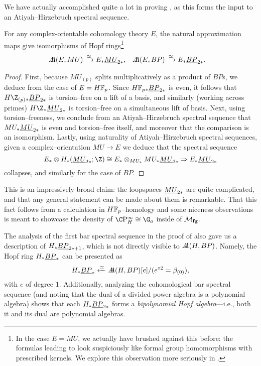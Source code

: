 We have actually accomplished quite a lot in proving , as this forms the input to an Atiyah--Hirzebruch spectral sequence.

\begin{corollary}\label{HopfRingForEBP}
For any complex-orientable cohomology theory $E$, the natural approximation maps give isomorphisms of Hopf rings\footnote{In the case $E = MU$, we actually have brushed against this before: the formulas leading to  look suspiciously like formal group homomorphisms with prescribed kernels.  We explore this observation more seriously in .}
\begin{align*}
\AA(E, MU)  & \xrightarrow{\simeq} E_* \OS{MU}{2*}, &
\AA(E, BP) & \xrightarrow{\simeq} E_* \OS{BP}{2*}.
\end{align*}
\end{corollary}
\begin{proof}
First, because $MU_{(p)}$ splits multiplicatively as a product of $BP$s, we deduce from  the case of $E = \HFp$.  Since $\HFp_* \OS{BP}{2*}$ is even, it follows that $H\Z_{(p)}{}_* \OS{BP}{2*}$ is torsion--free on a lift of a basis, and similarly (working across primes) $H\Z_* \OS{MU}{2*}$ is torsion--free on a simultaneous lift of basis.  Next, using torsion--freeness, we conclude from an Atiyah--Hirzebruch spectral sequence that $MU_* \OS{MU}{2*}$ is even and torsion--free itself, and moreover that the comparison is an isomorphism.  Lastly, using naturality of Atiyah--Hirzebruch spectral sequences, given a complex--orientation $MU \to E$ we deduce that the spectral sequence \[E_* \otimes H_*(\OS{MU}{2*}; \Z) \cong E_* \otimes_{MU_*} MU_* \OS{MU}{2*} \Rightarrow E_* \OS{MU}{2*}\] collapses, and similarly for the case of $BP$.
\end{proof}

This is an impressively broad claim: the loopspaces $\OS{MU}{2*}$ are quite complicated, and that any general statement can be made about them is remarkable.  That this fact follows from a calculation in $\HFp$--homology and some niceness observations is meant to showcase the density of $\CP^\infty_H \cong \G_a$ inside of $\moduli{fg}$.

\begin{remark}
The analysis of the first bar spectral sequence in the proof of  also gave us a description of $H_* \OS{BP}{2*+1}$, which is not directly visible to $\AA(H, BP)$.  Namely, the Hopf ring $H_* \OS{BP}{*}$ can be presented as \[H_* \OS{BP}{*} \xleftarrow{\simeq} \AA(H, BP)[e] / (e^{\circ 2} = \beta_{(0)}),\] with $e$ of degree $1$.  Additionally, analyzing the cohomological bar spectral sequence (and noting that the dual of a divided power algebra is a polynomial algebra) shows that each $H_* \OS{BP}{2*}$ forms a \textit{bipolynomial Hopf algebra}---i.e., both it and its dual are polynomial algebras.
\end{remark}

